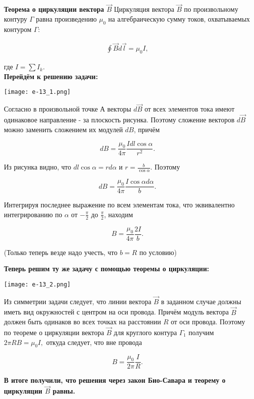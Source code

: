 \documentclass[__main__.tex]{subfiles}
\begin{document}
	
	
	\textbf{Теорема о циркуляции вектора $\vec{B}$}
	Циркуляция вектора $\vec{B}$ по произвольному контуру $\Gamma$ равна произведению $\mu_0$ на алгебраическую сумму токов, охватываемых контуром $\Gamma$:
	
	\begin{gather}
	\oint \vec{B} d\vec{l} = \mu_0 I,
	\end{gather}
	
	где $I = \sum I_k$.\\
	
	\textbf{Перейдём к решению задачи:}
	
	\begin{center}
		\texttt{[image: e-13\_1.png]}
	\end{center}

	Согласно  в произвольной точке А векторы $d\vec{B}$ от всех элементов тока имеют одинаковое направление - за плоскость рисунка. Поэтому сложение векторов $d\vec{B}$ можно заменить сложением их модулей $dB$, причём
	
	$$dB = \frac{\mu_0}{4\pi} \frac{I dl \cos \alpha}{r^2}.$$
	
	Из рисунка видно, что $dl \cos \alpha = r d\alpha$ и $r = \frac{b}{\cos \alpha}$. Поэтому 
	
	$$dB = \frac{\mu_0}{4\pi} \frac{I \cos \alpha d\alpha}{b}.$$
	
	Интегрируя последнее выражение по всем элементам тока, что эквивалентно интегрированию по $\alpha$ от $-\frac{\pi}{2}$ до $\frac{\pi}{2}$, находим
	
	$$B = \frac{\mu_0}{4\pi} \frac{2I}{b}.$$
	
	(Только теперь везде надо учесть, что $b = R$ по условию)
	
	\textbf{Теперь решим ту же задачу с помощью теоремы о циркуляции:}
	
	\begin{center}
		\texttt{[image: e-13\_2.png]}
	\end{center}

	Из симметрии задачи следует, что линии вектора $\vec{B}$ в заданном случае должны иметь вид окружностей с центром на оси провода. Причём модуль вектора $\vec{B}$ должен быть одинаков во всех точках на расстоянии $R$ от оси провода. Поэтому по теореме о циркуляции вектора $\vec{B}$ для круглого контура $\Gamma_1$ получим $2 \pi R B = \mu_0 I,$ откуда следует, что вне провода
	
	$$B = \frac{\mu_0}{2 \pi} \frac{I}{R}.$$
	
	\textbf{В итоге получили, что решения через закон Био-Савара и теорему о циркуляции $\vec{B}$ равны.}
\end{document}
